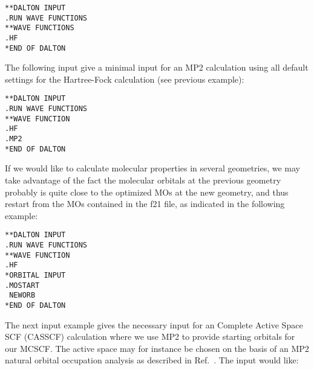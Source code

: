 \begin{verbatim}
**DALTON INPUT
.RUN WAVE FUNCTIONS
**WAVE FUNCTIONS
.HF
*END OF DALTON
\end{verbatim}
\label{sirius_ex1a}

The following input give a minimal input for an
MP2
calculation using all default settings for the Hartree-Fock
calculation (see previous example):

\begin{verbatim}
**DALTON INPUT
.RUN WAVE FUNCTIONS
**WAVE FUNCTION
.HF
.MP2
*END OF DALTON
\end{verbatim}
\label{sirius_ex1b}

If we would like to calculate molecular properties in several
geometries, we may take advantage of the fact the molecular
orbitals at the previous geometry probably is quite close to the
optimized MOs at the new geometry, and thus restart
from the MOs contained in the f21  file, as indicated in the following example:

\begin{verbatim}
**DALTON INPUT
.RUN WAVE FUNCTIONS
**WAVE FUNCTION
.HF
*ORBITAL INPUT
.MOSTART
 NEWORB
*END OF DALTON
\end{verbatim}
\label{sirius_ex2}

\begin{center}
\end{center}

The next input example gives the necessary input for an Complete
Active Space SCF (CASSCF) calculation where we use MP2 to provide
starting orbitals for our MCSCF. The
active space may for instance be
chosen on the basis of an MP2 natural orbital occupation
analysis as
described in Ref.~\cite{hjajpjhajojcp88}. The input would like:

